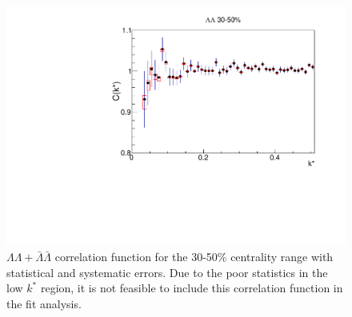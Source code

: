 \begin{figure}[hbt]
\includegraphics[width=36pc]{Figures/CFs/2016-8-30-CFLLAA3050CombinedSystematicsMaximum.pdf}
\caption[$\Lambda\Lambda + \bar{\Lambda}\bar{\Lambda}$ correlation function for the 30-50\% centrality range]{$\Lambda\Lambda + \bar{\Lambda}\bar{\Lambda}$ correlation function for the 30-50\% centrality range with statistical and systematic errors.  
Due to the poor statistics in the low $k^*$ region, it is not feasible to include this correlation function in the fit analysis.}
\label{fig:CFLamLamALamALam3050}
\end{figure}

